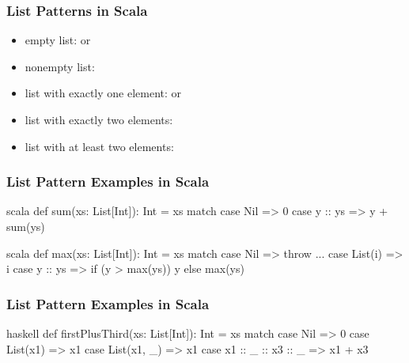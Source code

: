 \documentclass[dvipsnames]{beamer}
\theoremstyle{plain}
\begin{document}
\begin{frame}[fragile]
  \frametitle{List Patterns in Scala}

  \begin{itemize}
    \item empty list:  or 
    \item nonempty list: 
    \item list with exactly one element:  or
    \item list with exactly two elements: 
    \item list with at least two elements: 
  \end{itemize}
\end{frame}

\begin{frame}[fragile]
  \frametitle{List Pattern Examples in Scala}

  \begin{example}
    \begin{pygments}{scala}
def sum(xs: List[Int]): Int =
    xs match {
        case Nil => 0
        case y :: ys => y + sum(ys)
    }
    \end{pygments}
  \end{example}

  \pause
  \begin{example}
    \begin{pygments}{scala}
def max(xs: List[Int]): Int =
    xs match {
        case Nil => throw ...
        case List(i) => i
        case y :: ys => if (y > max(ys)) y else max(ys)
    }
    \end{pygments}
  \end{example}
\end{frame}

\begin{frame}[fragile]
  \frametitle{List Pattern Examples in Scala}

  \begin{example}
    \begin{pygments}{haskell}
def firstPlusThird(xs: List[Int]): Int =
    xs match {
        case Nil => 0
        case List(x1) => x1
        case List(x1, _) => x1
        case x1 :: _ :: x3 :: _ => x1 + x3
    }
    \end{pygments}
  \end{example}
\end{frame}
\end{document}
